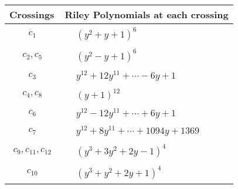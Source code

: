 \documentclass[1p]{elsarticle_modified}
\theoremstyle{definition}
\begin{document}
\begin{tabular}{m{50pt}|m{274pt}}
Crossings & \hspace{64pt}Riley Polynomials at each crossing \\
\hline $$\begin{aligned}c_{1}\end{aligned}$$&$\begin{aligned}
&(y^2+y+1)^6
\end{aligned}$\\
\hline $$\begin{aligned}c_{2},c_{5}\end{aligned}$$&$\begin{aligned}
&(y^2- y+1)^6
\end{aligned}$\\
\hline $$\begin{aligned}c_{3}\end{aligned}$$&$\begin{aligned}
&y^{12}+12 y^{11}+\cdots-6 y+1
\end{aligned}$\\
\hline $$\begin{aligned}c_{4},c_{8}\end{aligned}$$&$\begin{aligned}
&(y+1)^{12}
\end{aligned}$\\
\hline $$\begin{aligned}c_{6}\end{aligned}$$&$\begin{aligned}
&y^{12}-12 y^{11}+\cdots+6 y+1
\end{aligned}$\\
\hline $$\begin{aligned}c_{7}\end{aligned}$$&$\begin{aligned}
&y^{12}+8 y^{11}+\cdots+1094 y+1369
\end{aligned}$\\
\hline $$\begin{aligned}c_{9},c_{11},c_{12}\end{aligned}$$&$\begin{aligned}
&(y^3+3 y^2+2 y-1)^4
\end{aligned}$\\
\hline $$\begin{aligned}c_{10}\end{aligned}$$&$\begin{aligned}
&(y^3+y^2+2 y+1)^4
\end{aligned}$\\
\hline
\end{tabular}\\~\\
\end{document}
